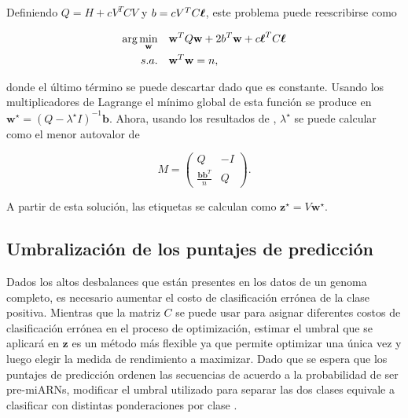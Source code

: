 \noindent Definiendo $ Q = H + c V ^ T C V $ y $ b = c V ^ T C \boldsymbol\ell $, este problema puede reescribirse como

\begin{equation}
	\begin{split}
		\arg\min_{\mathbf{w}} &\quad \mathbf{w}^T Q \mathbf{w} + 2 b^T \mathbf{w} + c \boldsymbol\ell^T C \boldsymbol\ell \\
		s.a. &\quad \mathbf{w}^T \mathbf{w} = n,
	\end{split}
\end{equation}

\noindent donde el último término se puede descartar dado que es constante. Usando los multiplicadores de Lagrange el mínimo global de esta función se produce
en $\mathbf {w}^\star = (Q - \lambda^\star I)^{- 1} \mathbf{b} $. Ahora, usando los resultados de \cite{gander1989contrained}, $ \lambda^\star$ se puede
calcular como el menor autovalor de

\begin{equation}
	M = \left( \begin{array}{cc}
			Q & -I \\
	\frac{{\mathbf{b} \mathbf{b}^T}}{{n}} & Q \end{array} \right).
\end{equation}

\noindent A partir de esta solución, las etiquetas se calculan como $ \mathbf {z} ^ \star = V \mathbf {w} ^ \star $.

\subsection{Umbralización de los puntajes de predicción}

Dados los altos desbalances que están presentes en los datos de un genoma completo, es necesario aumentar el costo de clasificación errónea de la clase
positiva. Mientras que la matriz $C$ se puede usar para asignar diferentes costos de clasificación errónea en el proceso de optimización, estimar el umbral que
se aplicará en $\mathbf{z}$ es un método más flexible ya que permite optimizar una única vez y luego elegir la medida de rendimiento a maximizar. Dado que se
espera que los puntajes de predicción ordenen las secuencias de acuerdo a la probabilidad de ser pre-miARNs, modificar el umbral utilizado para separar las dos
clases equivale a clasificar con distintas ponderaciones por clase \citep{mease2007boosted}.

